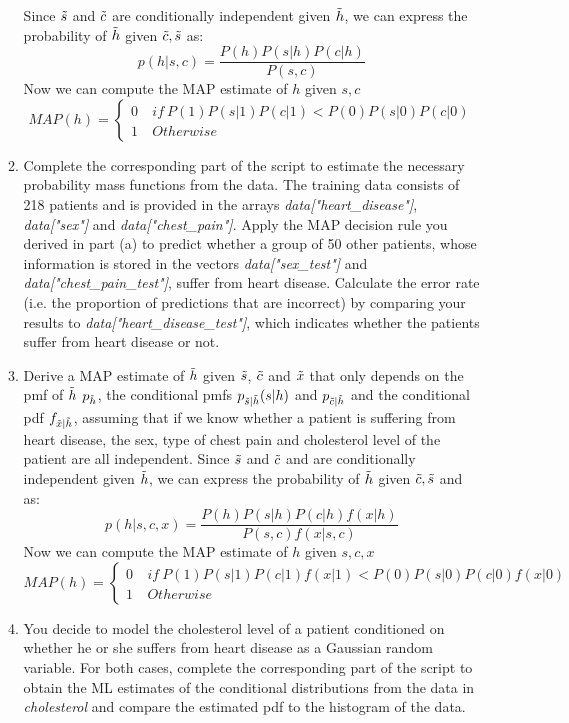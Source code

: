 \documentclass[12pt,twoside]{article}
\newcommand{\rnd}{\Tilde}
\begin{document}
\begin{enumerate}
\begin{enumerate}
\subitem
Since $\rnd{s}$ and $\rnd{c}$ are conditionally independent given $\rnd{h}$, we can express the probability of $\rnd{h}$ given $\rnd{c}, \rnd{s}$ as:
$$
    p(h|s,c) = \frac{P(h)P(s|h)P(c|h)}{P(s,c)}
$$
Now we can compute the MAP estimate of $h$ given $s,c$
$$
    MAP(h) = \begin{cases}
       0 & \ if \ P(1)P(s|1)P(c|1) < P(0)P(s|0)P(c|0) \\
       1 & \ Otherwise
    \end{cases}
$$
\item Complete the corresponding part of the script to estimate the necessary probability mass functions from the data. The training data consists of 218 patients and is provided in the arrays \emph{data["heart\_disease"]}, \emph{data["sex"]} and \emph{data["chest\_pain"]}. Apply the MAP decision rule you derived in part (a) to predict whether a group of 50 other patients, whose information is stored in the vectors \emph{data["sex\_test"]} and \emph{data["chest\_pain\_test"]}, suffer from heart disease. Calculate the error rate (i.e. the proportion of predictions that are incorrect) by comparing your results to \emph{data["heart\_disease\_test"]}, which indicates whether the patients suffer from heart disease or not.
\item Derive a MAP estimate of $\rnd{h}$ given $\rnd{s}$, $\rnd{c}$ and $\rnd{x}$ that only depends on the pmf of $\rnd{h}$ $ p_{\rnd{h}}$, the conditional pmfs $p_{\rnd{s}|\rnd{h}}(s|h)$ and $ p_{\rnd{c}|\rnd{h}}$ and the conditional pdf $f_{\rnd{x}|\rnd{h}}$, assuming that if we know whether a patient is suffering from heart disease,  the sex, type of chest pain and cholesterol level of the patient are all independent.
\subitem
Since $\rnd{s}$ and $\rnd{c}$ and \rnd{x} are conditionally independent given $\rnd{h}$, we can express the probability of $\rnd{h}$ given $\rnd{c}, \rnd{s}$ and \rnd{x} as:
$$
    p(h|s,c,x) = \frac{P(h)P(s|h)P(c|h)f(x|h)}{P(s,c)f(x|s,c)}
$$
Now we can compute the MAP estimate of $h$ given $s,c,x$
$$
    MAP(h) = \begin{cases}
       0 & \ if \ P(1)P(s|1)P(c|1)f(x|1) < P(0)P(s|0)P(c|0)f(x|0) \\
       1 & \ Otherwise
    \end{cases}
$$
\item You decide to model the cholesterol level of a patient conditioned on whether he or she suffers from heart disease as a Gaussian random variable. For both cases, complete the corresponding part of the script to obtain the ML estimates of the conditional distributions from the data in \emph{cholesterol} and compare the estimated pdf to the histogram of the data. 

\end{enumerate}
\end{enumerate}
\end{document}
